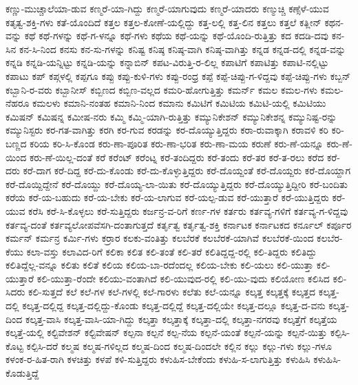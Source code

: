 {ಕಣ್ಣು-ಮುಚ್ಚಾಲೆಯಾ-ಡುವ
ಕಣ್ಮರೆ-ಯಾ-ಗಿದ್ದು
ಕಣ್ಮರೆ-ಯಾಗುವುದು
ಕಣ್ಮರೆ-ಯಾದರು
ಕಣ್ಮುಚ್ಚಿ
ಕಣ್ಸೆಳೆ-ಯುವ
ಕತೃತ್ವ-ಶಕ್ತಿ-ಗಳು
ಕತೆ-ಯೊಂದಿದೆ
ಕತ್ತಲ
ಕತ್ತಲ-ಕೋಣೆ-ಯಲ್ಲಿದ್ದು
ಕತ್ತ-ಲಲ್ಲಿ
ಕತ್ತ-ಲಿನ
ಕತ್ತಲು
ಕತ್ತಲೆ
ಕತ್ಲೀನ್
ಕಥನ-ವನ್ನು
ಕಥೆ
ಕಥೆ-ಗಳನ್ನು
ಕಥೆ-ಗ-ಳನ್ನೂ
ಕಥೆ-ಗಳು
ಕಥೆಯ
ಕಥೆ-ಯನ್ನು
ಕಥೆ-ಯೊಂದಿ-ರುತ್ತಿತ್ತು
ಕದ
ಕದಡಿ-ದವು
ಕನ-ಸಿನ
ಕನ-ಸಿ-ನಿಂದ
ಕನಸು
ಕನ-ಸು-ಗಳನ್ನು
ಕನಿಷ್ಟ
ಕನಿಷ್ಠ
ಕನಿಷ್ಠ-ವಾಗಿ
ಕನಿಷ್ಠ-ವಾಗಿತ್ತು
ಕನ್ನಡ
ಕನ್ನಡ-ದಲ್ಲಿ
ಕನ್ನಡ-ವನ್ನು
ಕನ್ನಡಿ
ಕನ್ನಡಿ-ಯನ್ನಿಟ್ಟು
ಕನ್ನಡಿ-ಯನ್ನು
ಕನ್ನಾಬಿನ್
ಕಪಟ-ವಿರುತ್ತಿ-ರ-ಲಿಲ್ಲ
ಕಪಾಟಿಗೆ
ಕಪಾಟಿತ್ತು
ಕಪಾಟಿ-ನಲ್ಲಿಟ್ಟು
ಕಪಾಟು
ಕಪ್
ಕಪ್ಗಳಲ್ಲಿ
ಕಪ್ಪಗೂ
ಕಪ್ಪು
ಕಪ್ಪು-ಕುಳಿ-ಗಳು
ಕಪ್ಪು-ರಂಧ್ರ
ಕಪ್ಪೆ
ಕಪ್ಪೆ-ಚಿಪ್ಪು-ಗ-ಳಿದ್ದವು
ಕಪ್ಪೆ-ಚಿಪ್ಪು-ಗಳು
ಕಬ್ಬನ್
ಕಬ್ಬಾನಿ-ರ-ವರು
ಕಬ್ಬಾನೀಸ್
ಕಬ್ಬಿಣದ
ಕಬ್ಬಿಣ-ವಲ್ಲದ
ಕಮರಿ-ಹೋಗುತ್ತಿತ್ತು
ಕಮರ್ನ್
ಕಮಲ
ಕಮಲ-ಗಳು
ಕಮಲ-ನೆಹರೂ
ಕಮಲಳು
ಕಮಾನಿ-ನಂತಹ
ಕಮಾನಿ-ನಿಂದ
ಕಮಾನು
ಕಮಿಟಿಗೆ
ಕಮಿಟಿಯ
ಕಮಿಟಿ-ಯಲ್ಲಿ
ಕಮಿಟಿಯು
ಕಮಿಷನ್
ಕಮಿಷನ್ನ
ಕಮೀಷ-ನರು
ಕಮ್ಮಿ
ಕಮ್ಮಿ-ಯಾಗಿ-ರುತ್ತಿತ್ತು
ಕಮ್ಯುನಿಕೇಶನ್
ಕಮ್ಯುನಿಕೇಶನ್ನ
ಕಮ್ಯುನಿಷ್ಟ-ರನ್ನು
ಕಮ್ಯುನಿಸ್ಟರು
ಕರ-ಗತ-ವಾಗಿತ್ತು
ಕರಗಿ
ಕರ-ಗುವ
ಕರಡನ್ನು
ಕರ-ದೊಯ್ಯುತ್ತಿದ್ದರು
ಕರಾ-ರುವಾಕ್ಕಾಗಿ
ಕರಾವಳಿ
ಕರಿ
ಕರಿ-ಬಣ್ಣದ
ಕರಿಯ
ಕರಿ-ಸಿ-ಕೊಂಡ
ಕರು-ಣಾ-ಪೂರಿತ
ಕರು-ಣಾ-ಭರಿತ
ಕರು-ಣಾ-ಮಯ
ಕರುಣೆ
ಕರು-ಣೆ-ಯನ್ನೂ
ಕರು-ಣೆ-ಯಿಂದ
ಕರು-ಣೆ-ಯಿಲ್ಲ-ದಂತೆ
ಕರೆ
ಕರೆಂಟ್
ಕರೆಂಟ್ನ
ಕರೆ-ತಂದಿದ್ದರು
ಕರೆ-ತಂದು
ಕರೆ-ತರ
ಕರೆ-ತ-ರಲು
ಕರೆದ
ಕರೆ-ದರು
ಕರೆ-ದಾಗ
ಕರೆ-ದಿದ್ದ
ಕರೆ-ದು-ಕೊಂಡು
ಕರೆ-ದು-ಕೊಳ್ಳುತ್ತಿದ್ದರು
ಕರೆ-ದೊಯ್ದಂತೆ
ಕರೆ-ದೊಯ್ದರು
ಕರೆ-ದೊಯ್ದಾಗ
ಕರೆ-ದೊಯ್ದಿದ್ದೇನೆ
ಕರೆ-ದೊಯ್ದು
ಕರೆ-ದೊಯ್ಯ-ಲಾ-ಯಿತು
ಕರೆ-ದೊಯ್ಯುತ್ತಿದ್ದರು
ಕರೆ-ದೊಯ್ಯುತ್ತಿದ್ದೀರಿ
ಕರೆ-ಬಂದಿತು
ಕರೆಯ
ಕರೆ-ಯ-ಬಹುದು
ಕರೆ-ಯ-ಬೇಕು
ಕರೆ-ಯ-ಲಾಗುವ
ಕರೆ-ಯಲ್ಪ-ಡುವ
ಕರೆ-ಯುತ್ತಾರೆ
ಕರೆ-ಯುತ್ತಿದ್ದರು
ಕರೆ-ಯುವ
ಕರೆಸಿ
ಕರೆ-ಸಿ-ಕೊಳ್ಳಲು
ಕರೆ-ಸುತ್ತಿದ್ದರು
ಕರ್ಜನ್ರ-ವ-ರಿಗೆ
ಕರ್ಣ-ಗಳ
ಕರ್ತರು
ಕರ್ತವ್ಯ-ಗಳಿಗೆ
ಕರ್ತವ್ಯ-ಗ-ಳಿದ್ದವು
ಕರ್ತವ್ಯ-ದಂತೆ
ಕರ್ತವ್ಯಲೋಪವೆಸಗಿ-ದಂತಾಗುತ್ತದೆ
ಕರ್ತೃತ್ವ
ಕರ್ತೃತ್ವ-ಶಕ್ತಿ
ಕರ್ನಾಟಕ
ಕರ್ನಾಟಕದ
ಕರ್ನೂಲ್
ಕರ್ಪೂರ
ಕರ್ಮನ್
ಕರ್ಮನ್ರ
ಕರ್ಮಿ-ಗಳು
ಕರ್ರಾರ
ಕಲಕು-ವಂತಿತ್ತು
ಕಲಬೆರಕೆ
ಕಲಬೆರಕೆ-ಯಾಗಿವೆ
ಕಲಬೆರಕೆ-ಯಿಂದ
ಕಲಬೆರ-ಕೆಯು
ಕಲಾ-ವಸ್ತು
ಕಲಾವಿದ-ರಿಗೆ
ಕಲಿಕಾ
ಕಲಿತ
ಕಲಿ-ತಂತೆ
ಕಲಿ-ತರೆ
ಕಲಿತಿದ್ದದ್ದ-ರಲ್ಲಿ
ಕಲಿ-ತಿದ್ದರು
ಕಲಿತಿದ್ದು
ಕಲಿತಿದ್ದೆಲ್ಲ-ವನ್ನೂ
ಕಲಿತು
ಕಲಿತೆ
ಕಲಿಯ
ಕಲಿಯ-ಬಾ-ರದೆಂದಲ್ಲ
ಕಲಿಯ-ಬೇಕು
ಕಲಿ-ಯಲು
ಕಲಿ-ಯುತ್ತಾ
ಕಲಿ-ಯುತ್ತಾರೆ
ಕಲಿ-ಯುತ್ತಾ-ರೆಂದೇ
ಕಲಿಯು-ವಂತಾಗಿದೆ
ಕಲಿ-ಯುವುದ-ರಲ್ಲಿ
ಕಲಿ-ಯು-ವುದು
ಕಲಿಯೋಣ
ಕಲಿಸಿದ
ಕಲಿ-ಸಿದರು
ಕಲಿ-ಸುತ್ತದೆ
ಕಲೆ
ಕಲೆ-ಗಳ
ಕಲೆ-ಗಳಲ್ಲಿ
ಕಲೆ-ಗಾರಳು
ಕಲೆತು
ಕಲೆ-ಯನ್ನೂ
ಕಲ್ಕತ್ತ
ಕಲ್ಕತ್ತಕ್ಕೆ
ಕಲ್ಕತ್ತದ
ಕಲ್ಕತ್ತ-ದಲ್ಲಿ
ಕಲ್ಕತ್ತ-ದಲ್ಲಿದ್ದ
ಕಲ್ಕತ್ತ-ದಲ್ಲಿದ್ದು-ಕೊಂಡು
ಕಲ್ಕತ್ತ-ದಲ್ಲಿದ್ದೆ
ಕಲ್ಕತ್ತ-ದಲ್ಲಿಯೇ
ಕಲ್ಕತ್ತ-ದಲ್ಲೂ
ಕಲ್ಕತ್ತ-ದ-ವನು
ಕಲ್ಕತ್ತ-ದಿಂದ
ಕಲ್ಕತ್ತ-ವಾಸಿ
ಕಲ್ಕತ್ತ-ವಾಸಿ-ಯಾ-ಗಿದ್ದು
ಕಲ್ಕತ್ತಾ
ಕಲ್ಕತ್ತಾಕ್ಕೆ
ಕಲ್ಕತ್ತಾ-ದಲ್ಲಿ
ಕಲ್ಕತ್ತಾ-ನಗರವು
ಕಲ್ಕತ್ತೆಗೆ
ಕಲ್ಕತ್ತೆಯ
ಕಲ್ಕತ್ತೆ-ಯಲ್ಲಿ
ಕಲ್ಟಿವೇಶನ್
ಕಲ್ಟಿವೇಷನ್
ಕಲ್ಪನಾ
ಕಲ್ಪನೆ
ಕಲ್ಪ-ನೆಯ
ಕಲ್ಪನೆ-ಯಂತೆ
ಕಲ್ಪನೆ-ಯನ್ನು
ಕಲ್ಪನೆ-ಯಿತ್ತು
ಕಲ್ಪಿಸಿ-ಕೊಟ್ಟ
ಕಲ್ಪಿಸಿ-ದರೆ
ಕಲ್ಮಷ
ಕಲ್ಮಷ-ಗಳಿಲ್ಲದ
ಕಲ್ಮಷ-ದಿಂದ
ಕಲ್ಮಷ-ದಿಂದಲೇ
ಕಲ್ಲಿನ
ಕಲ್ಲು
ಕಲ್ಲು-ಗಳು
ಕಲ್ಲು-ಗಳೂ
ಕಳಂಕ-ರ-ಹಿತ-ರಾಗಿ
ಕಳಚಿತ್ತು
ಕಳಪೆ
ಕಳಿ-ಸುತ್ತಿದ್ದರು
ಕಳುಹಿಸ-ಬೇಕೆಂದು
ಕಳುಹಿ-ಸ-ಲಾಗುತ್ತಿತ್ತು
ಕಳುಹಿಸಿ
ಕಳುಹಿಸಿ-ಕೊಡುತ್ತಿದ್ದೆ
}
